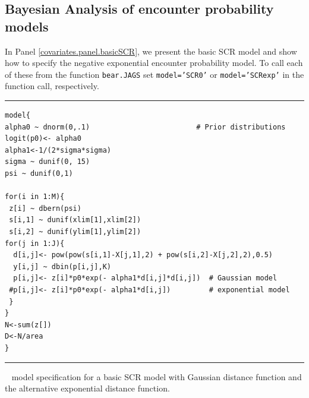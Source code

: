 \subsection{Bayesian Analysis of encounter probability models}


In Panel \ref{covariates.panel.basicSCR}, we present the basic SCR
model and show how to specify the negative exponential encounter
probability model.
  To call each of these from the function {\tt bear.JAGS} set
{\tt model='SCR0'} or {\tt model='SCRexp'} in the function call,
respectively.

\begin{panel}[htp]
\centering
\rule[0.1in]{\textwidth}{.03in}
{\small
\begin{verbatim}
model{
alpha0 ~ dnorm(0,.1)                         # Prior distributions
logit(p0)<- alpha0
alpha1<-1/(2*sigma*sigma)
sigma ~ dunif(0, 15)
psi ~ dunif(0,1)

for(i in 1:M){
 z[i] ~ dbern(psi)
 s[i,1] ~ dunif(xlim[1],xlim[2])
 s[i,2] ~ dunif(ylim[1],ylim[2])
for(j in 1:J){
  d[i,j]<- pow(pow(s[i,1]-X[j,1],2) + pow(s[i,2]-X[j,2],2),0.5)
  y[i,j] ~ dbin(p[i,j],K)
  p[i,j]<- z[i]*p0*exp(- alpha1*d[i,j]*d[i,j])  # Gaussian model
 #p[i,j]<- z[i]*p0*exp(- alpha1*d[i,j])         # exponential model
 }
}
N<-sum(z[])
D<-N/area
}
\end{verbatim}
}

\rule[-0.1in]{\textwidth}{.03in}
\caption{
\jags~ model specification for a basic SCR model with Gaussian
distance 
function and the alternative exponential distance function.}
\label{covariates.panel.basicSCR}
\end{panel}

